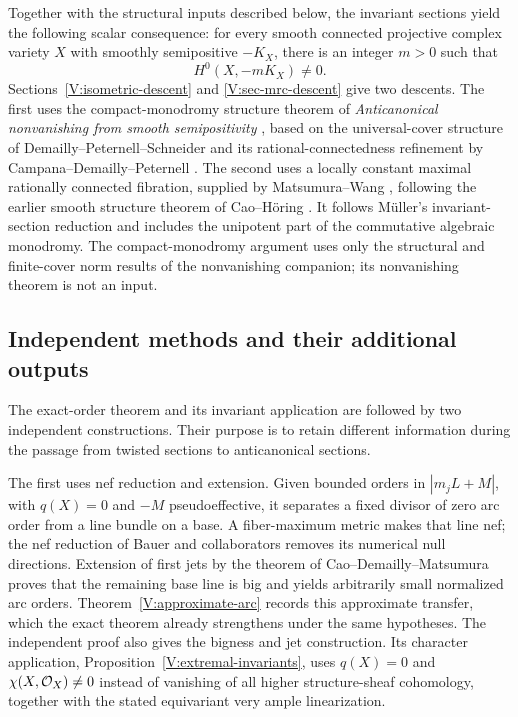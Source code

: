 Together with the structural inputs described below, the invariant
sections yield the following scalar consequence: for every smooth
connected projective complex variety $X$ with smoothly semipositive
$-K_X$, there is an integer $m>0$ such that
\[
 H^0(X,-mK_X)\ne0.
\]
Sections~\ref{V:isometric-descent} and \ref{V:sec-mrc-descent} give
two descents.  The first uses the compact-monodromy structure theorem
of \emph{Anticanonical nonvanishing from smooth semipositivity}
\cite[Theorem \textup{(Finite cover with compact torus monodromy)}]{CompanionH},
based on the universal-cover structure of
Demailly--Peternell--Schneider and its rational-connectedness refinement
by Campana--Demailly--Peternell \cite{DPS1996,CDP2015}.
The second uses a locally constant maximal rationally connected
fibration, supplied by Matsumura--Wang \cite{MatsumuraWangV3},
following the earlier smooth structure theorem of Cao--H\"oring
\cite{CaoHoring}.  It follows M\"uller's invariant-section reduction
\cite[Theorem~2.2]{Muller2025} and includes the unipotent part of the
commutative algebraic monodromy.  The compact-monodromy argument
uses only the structural and finite-cover norm results of the
nonvanishing companion; its nonvanishing theorem is not an input.

\subsection{Independent methods and their additional outputs}
The exact-order theorem and its invariant application are followed by
two independent constructions.  Their purpose is to retain different
information during the passage from twisted sections to anticanonical
sections.

The first uses nef reduction and extension.  Given bounded orders in
$|m_jL+M|$, with $q(X)=0$ and $-M$ pseudoeffective, it separates a
fixed divisor of zero arc order from a line bundle on a base.  A
fiber-maximum metric makes that line nef; the nef reduction of Bauer
and collaborators \cite{BCEKPRSW2002} removes its numerical null
directions.  Extension of first jets by the theorem of
Cao--Demailly--Matsumura \cite{CDM2017} proves that the remaining base
line is big and yields arbitrarily small normalized arc orders.
Theorem~\ref{V:approximate-arc} records this approximate transfer,
which the exact theorem already strengthens under the same hypotheses.
The independent proof also gives the bigness and jet construction.
Its character application, Proposition~\ref{V:extremal-invariants},
uses $q(X)=0$ and $\chi(X,\mathcal O_X)\ne0$ instead of vanishing of all
higher structure-sheaf cohomology, together with the stated equivariant
very ample linearization.

